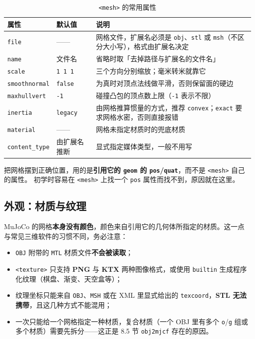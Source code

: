 \begin{table}[H]
	\centering
	\caption{\texttt{<mesh>} 的常用属性}
	\label{tab:Mjcf:mesh属性}
	\footnotesize
	\begin{tabular}{>{\raggedright\arraybackslash}p{3.1cm}>{\raggedright\arraybackslash}p{3.4cm}>{\raggedright\arraybackslash}p{7.8cm}}
		\hline
		属性 & 默认值 & 说明 \\
		\hline
		\texttt{file} & —— & 网格文件，扩展名必须是 \texttt{obj}、\texttt{stl} 或 \texttt{msh}（不区分大小写），格式由扩展名决定 \\
		\texttt{name} & 文件名 & 省略时取「去掉路径与扩展名的文件名」 \\
		\texttt{scale} & \texttt{1 1 1} & 三个方向分别缩放；毫米转米就靠它 \\
		\texttt{smoothnormal} & \texttt{false} & 为真时对顶点法线做平滑，否则保留面的硬边 \\
		\texttt{maxhullvert} & \texttt{-1} & 碰撞凸包的顶点数上限（\texttt{-1} 表示不限） \\
		\texttt{inertia} & \texttt{legacy} & 由网格推算惯量的方式，推荐 \texttt{convex}；\texttt{exact} 要求网格水密，否则直接报错 \\
		\texttt{material} & —— & 网格未指定材质时的兜底材质 \\
		\texttt{content\_type} & 由扩展名推断 & 显式指定媒体类型，一般不用写 \\
		\hline
	\end{tabular}
\end{table}

\begin{warnbox}
	把网格摆到正确位置，用的是\textbf{引用它的 \texttt{geom} 的 \texttt{pos}/\texttt{quat}}，而不是 \texttt{<mesh>} 自己的属性。
	初学时容易在 \texttt{<mesh>} 上找一个 \texttt{pos} 属性而找不到，原因就在这里。
\end{warnbox}

\subsection{外观：材质与纹理}

MuJoCo 的网格\textbf{本身没有颜色}，颜色来自引用它的几何体所指定的材质。这一点与常见三维软件的习惯不同，务必注意：

\begin{itemize}
	\item \texttt{OBJ} 附带的 \texttt{MTL} 材质文件\textbf{不会被读取}；
	\item \texttt{<texture>} 只支持 \textbf{PNG} 与 \textbf{KTX} 两种图像格式，或使用 \texttt{builtin} 生成程序化纹理（棋盘、渐变、天空盒等）；
	\item 纹理坐标只能来自 \texttt{OBJ}、\texttt{MSH} 或在 XML 里显式给出的 \texttt{texcoord}，\textbf{STL 无法携带}，且这几种方式不能混用；
	\item 一次只能给一个网格指定一种材质，复合材质（一个 OBJ 里有多个 \texttt{o}/\texttt{g} 组或多个材质）需要先拆分——这正是 8.5 节 \texttt{obj2mjcf} 存在的原因。
\end{itemize}

